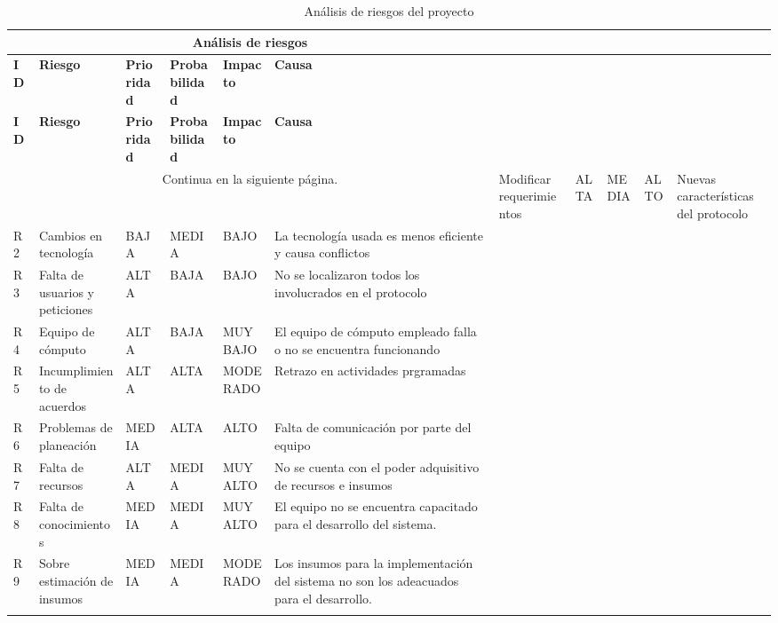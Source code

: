 \begin{longtable}{| p{1cm} | p{4cm} | p{2cm} | p{2.5cm} | p{2cm} | p{4cm} |}

\hline
\multicolumn{6}{|c|}{\textbf{Análisis de riesgos}} \\ \hline
\textbf{ID} &  \textbf{Riesgo} & \textbf{Prioridad} & \textbf{Probabilidad} & \textbf{Impacto} & \textbf{Causa}\\
\hline \hline
\endfirsthead

\hline
\textbf{ID} &  \textbf{Riesgo} & \textbf{Prioridad} & \textbf{Probabilidad} & \textbf{Impacto} & \textbf{Causa}\\
\hline \hline
\endhead

\multicolumn{6}{|c|}{Continua en la siguiente página.}
\endfoot

\endlastfoot

R1 & Modificar requerimientos &  ALTA & MEDIA & ALTO & Nuevas características del protocolo \\ \hline
R2 & Cambios en tecnología & BAJA & MEDIA & BAJO & La tecnología usada es menos eficiente y causa conflictos \\ \hline
R3 & Falta de usuarios y peticiones & ALTA & BAJA &  BAJO & No se localizaron todos los involucrados en el protocolo \\ \hline
R4 & Equipo de cómputo & ALTA & BAJA & MUY BAJO & El equipo de cómputo empleado falla o no se encuentra funcionando \\ \hline
R5 & Incumplimiento de acuerdos & ALTA & ALTA & MODERADO & Retrazo en actividades prgramadas \\ \hline
R6 & Problemas de planeación & MEDIA & ALTA & ALTO & Falta de comunicación por parte del equipo \\ \hline
R7 & Falta de recursos & ALTA & MEDIA & MUY ALTO & No se cuenta con el poder adquisitivo de recursos e insumos \\ \hline
R8 & Falta de conocimientos & MEDIA & MEDIA & MUY ALTO & El equipo no se encuentra capacitado para el desarrollo del sistema. \\ \hline
R9 & Sobre estimación de insumos & MEDIA & MEDIA & MODERADO & Los insumos para la implementación del sistema no son los adeacuados para el desarrollo. 

\\ \hline
\caption{Análisis de riesgos del proyecto}
\label{Análisis de riesgos }
\end{longtable}

